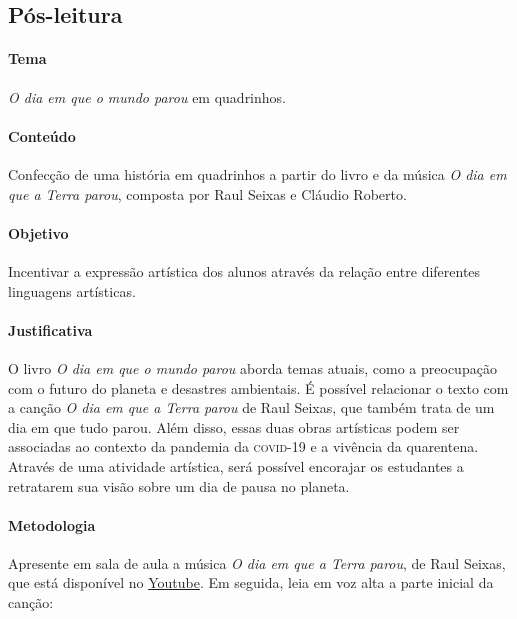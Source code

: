 \documentclass[11pt]{extarticle}
\begin{document}
\subsection{Pós-leitura}


\paragraph{Tema} \textit{O dia em que o mundo parou} em quadrinhos.

\paragraph{Conteúdo} Confecção de uma história em quadrinhos a partir do livro e da música \textit{O dia em que a Terra parou}, composta por Raul Seixas e Cláudio Roberto.


\paragraph{Objetivo} Incentivar a expressão artística dos alunos através da relação entre diferentes linguagens artísticas.

\paragraph{Justificativa} O livro \textit{O dia em que o mundo parou} aborda temas atuais, como a preocupação com o futuro do planeta e desastres ambientais. É possível relacionar o texto com a canção \textit{O dia em que a Terra parou} de Raul Seixas, que também trata de um dia em que tudo parou. Além disso, essas duas obras artísticas podem ser associadas ao contexto da pandemia da \textsc{covid}-19 e a vivência da quarentena. Através de uma atividade artística, será possível encorajar os estudantes a retratarem sua visão sobre um dia de pausa no planeta.

\paragraph{Metodologia} Apresente em sala de aula a música \textit{O dia em que a Terra parou}, de Raul Seixas, que está disponível no \href{https://youtu.be/SqQfySakoK0}{Youtube}. Em seguida, leia em voz alta a parte inicial da canção:
\end{document}
